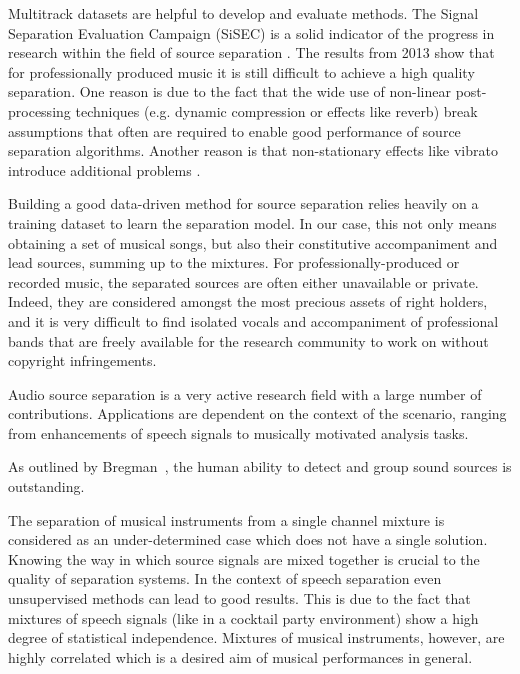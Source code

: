 Multitrack datasets are helpful to develop and evaluate methods.
The Signal Separation Evaluation Campaign (SiSEC) is a solid indicator of the progress in research within the field of source separation \cite{vincent12}. The results from 2013 \cite{sisec13} show that for professionally produced music it is still difficult to achieve a high quality separation.
One reason is due to the fact that the wide use of non-linear post-processing techniques (e.g. dynamic compression or effects like reverb) break assumptions that often are required to enable good performance of source separation algorithms. Another reason is that non-stationary effects like vibrato introduce additional problems \cite{nakano10}.


Building a good data-driven method for source separation relies heavily on a training dataset to learn the separation model. In our case, this not only means obtaining a set of musical songs, but also their constitutive accompaniment and lead sources, summing up to the mixtures. For professionally-produced or recorded music, the separated sources are often either unavailable or private. Indeed, they are considered amongst the most precious assets of right holders, and it is very difficult to find isolated vocals and accompaniment of professional bands that are freely available for the research community to work on without copyright infringements.

Audio source separation is a very active research field with a large number of contributions. Applications are dependent on the context of the scenario, ranging from enhancements of speech signals to musically motivated analysis tasks.

As outlined by Bregman~\cite{bregman94}, the human ability to detect and group sound sources is outstanding.

The separation of musical instruments from a single channel mixture is considered as an under-determined case which does not have a single solution. Knowing the way in which source signals are mixed together is crucial to the quality of separation systems. In the context of speech separation even unsupervised methods can lead to good results. This is due to the fact that mixtures of speech signals (like in a cocktail party environment) show a high degree of statistical independence. Mixtures of musical instruments, however, are highly correlated which is a desired aim of musical performances in general.

